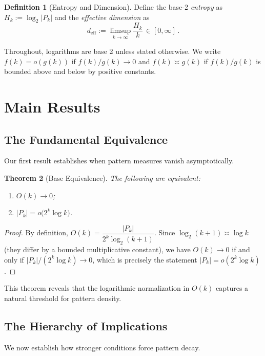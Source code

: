 \documentclass[11pt]{article}
\newtheorem{theorem}{Theorem}
\theoremstyle{definition}
\newtheorem{definition}[theorem]{Definition}
\begin{document}
\begin{definition}[Entropy and Dimension]
Define the base-2 \emph{entropy} as $H_k:=\log_2|P_k|$ and the \emph{effective dimension} as
\begin{equation}
d_{\mathrm{eff}}:=\limsup_{k\to\infty} \frac{H_k}{k}\,\in[0,\infty]\,.
\end{equation}
\end{definition}

Throughout, logarithms are base 2 unless stated otherwise. We write $f(k)=o(g(k))$ if $f(k)/g(k)\to 0$ and $f(k)\asymp g(k)$ if $f(k)/g(k)$ is bounded above and below by positive constants.

\section{Main Results}

\subsection{The Fundamental Equivalence}

Our first result establishes when pattern measures vanish asymptotically.

\begin{theorem}[Base Equivalence]\label{thm:base-equivalence}
The following are equivalent:
\begin{enumerate}
\item[(i)] $O(k)\to 0$;
\item[(ii)] $|P_k|=o\big(2^k\log k\big)$.
\end{enumerate}
\end{theorem}

\begin{proof}
By definition, $O(k)=\dfrac{|P_k|}{2^k\log_2(k+1)}$. Since $\log_2(k+1)\asymp\log k$ (they differ by a bounded multiplicative constant), we have $O(k)\to 0$ if and only if $|P_k|/(2^k\log k)\to 0$, which is precisely the statement $|P_k|=o(2^k\log k)$.
\end{proof}

This theorem reveals that the logarithmic normalization in $O(k)$ captures a natural threshold for pattern density.

\subsection{The Hierarchy of Implications}

We now establish how stronger conditions force pattern decay.
\end{document}
